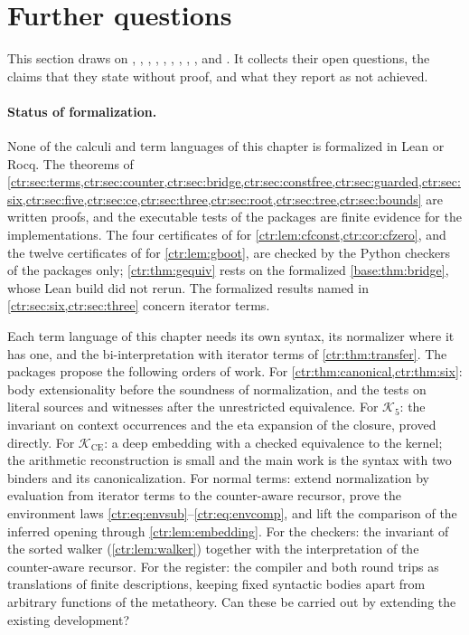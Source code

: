 \section{Further questions}\label{ctr:sec:questions}

This section draws on , ,
, , ,
, , ,
,  and . It collects
their open questions, the claims
that they state without proof, and what they report as not achieved.

\paragraph{Status of formalization.}
None of the calculi and term languages of this chapter is formalized in Lean or Rocq. The
theorems of \cref{ctr:sec:terms,ctr:sec:counter,ctr:sec:bridge,ctr:sec:constfree,ctr:sec:guarded,ctr:sec:six,ctr:sec:five,ctr:sec:ce,ctr:sec:three,ctr:sec:root,ctr:sec:tree,ctr:sec:bounds}
are written proofs, and the executable tests of the packages are finite evidence for the
implementations. The four certificates of  for
\cref{ctr:lem:cfconst,ctr:cor:cfzero}, and the twelve certificates of
 for \cref{ctr:lem:gboot}, are checked by the Python checkers of
the packages only; \cref{ctr:thm:gequiv} rests on the formalized \cref{base:thm:bridge},
whose Lean build  did not rerun. The formalized
results named in \cref{ctr:sec:six,ctr:sec:three} concern
iterator terms.

\begin{question}[Formalization]
Each term language of this chapter needs its own syntax, its normalizer where it has one,
and the bi-interpretation with iterator terms of \cref{ctr:thm:transfer}. The packages
propose the following orders of work. For \cref{ctr:thm:canonical,ctr:thm:six}: body
extensionality before the soundness of normalization, and the tests on literal sources and
witnesses after the unrestricted equivalence. For $\mathcal K_5$: the invariant on context
occurrences and the eta expansion of the closure, proved directly. For
$\mathcal K_{\mathrm{CE}}$: a deep embedding with a checked equivalence to the kernel; the
arithmetic reconstruction is small and the main work is the syntax with two binders and its
canonicalization. For normal terms: extend normalization by evaluation from iterator terms
to the counter-aware recursor, prove the environment laws
\eqref{ctr:eq:envsub}--\eqref{ctr:eq:envcomp}, and lift the comparison of the inferred
opening through \cref{ctr:lem:embedding}. For the checkers: the invariant of the sorted
walker (\cref{ctr:lem:walker}) together with the interpretation of the counter-aware
recursor. For the register: the compiler and both round trips as translations of finite
descriptions, keeping fixed syntactic bodies apart from arbitrary functions of the
metatheory. Can these be carried out by extending the existing development?
\end{question}

